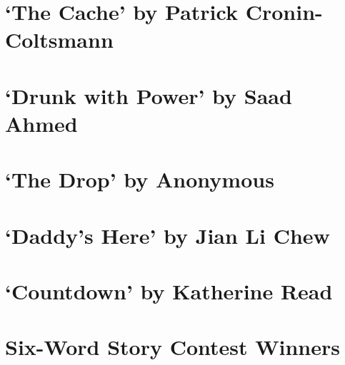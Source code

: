 \documentclass[a4paper,14pt]{article}
\begin{document}
\clearpage
\section{`The Cache' by Patrick Cronin-Coltsmann}


\clearpage
\section{`Drunk with Power' by Saad Ahmed}


\clearpage
\section{`The Drop' by Anonymous}


\clearpage
\section{`Daddy's Here' by Jian Li Chew}


\clearpage
\section{`Countdown' by Katherine Read}


\clearpage
\section{Six-Word Story Contest Winners}


\clearpage
\begin{figure}
\thispagestyle{empty}
\end{figure}
\end{document}
